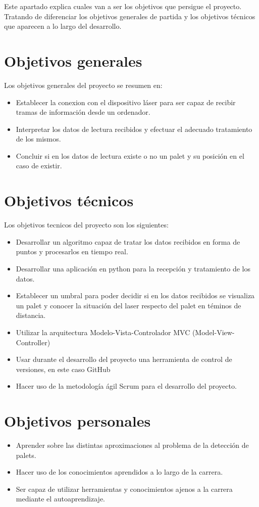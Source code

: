 
Este apartado explica cuales van a ser los objetivos que persigue el proyecto. Tratando de diferenciar los objetivos generales de partida y los objetivos técnicos que aparecen a lo largo del desarrollo.

\section{Objetivos generales}
Los objetivos generales del proyecto se resumen en:
\begin{itemize}
	\item Establecer la conexion con el dispositivo láser para ser capaz de recibir tramas de información desde un ordenador.
	\item Interpretar los datos de lectura recibidos y efectuar el adecuado tratamiento de los mismos.
	\item Concluir si en los datos de lectura existe o no un palet y su posición en el caso de existir.
\end{itemize}

\section{Objetivos técnicos}
Los objetivos tecnicos del proyecto son los siguientes:
\begin{itemize}
	\item Desarrollar un algoritmo capaz de tratar los datos recibidos en forma de puntos y procesarlos en tiempo real.
	\item Desarrollar una aplicación en python para la recepción y tratamiento de los datos.
	\item Establecer un umbral para poder decidir si en los datos recibidos se visualiza un palet y conocer la situación del laser respecto del palet en téminos de distancia.
	\item Utilizar la arquitectura Modelo-Vista-Controlador MVC (Model-View-Controller)
	\item Usar durante el desarrollo del proyecto una herramienta de control de versiones, en este caso GitHub
	\item Hacer uso de la metodología ágil Scrum para el desarrollo del proyecto.
\end{itemize}

\section{Objetivos personales}
\begin{itemize}
\item Aprender sobre las distintas aproximaciones al problema de la detección de palets.
\item Hacer uso de los conocimientos aprendidos a lo largo de la carrera.
\item Ser capaz de utilizar herramientas y conocimientos ajenos a la carrera mediante el autoaprendizaje.
\end{itemize}


